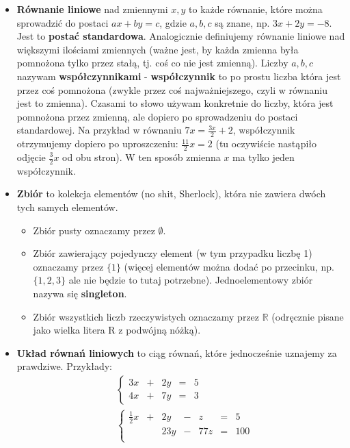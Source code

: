 \documentclass{article}
\theoremstyle{remark}
\begin{document}
\begin{itemize}
  \item \textbf{Równanie liniowe} nad zmiennymi $x, y$
  to każde równanie, które można sprowadzić do postaci
  $ax + by = c$, gdzie $a, b, c$ są znane, np. $3x+2y=-8$.
  Jest to \textbf{postać standardowa}.
  Analogicznie definiujemy równanie liniowe
  nad większymi ilościami zmiennych
  (ważne jest, by każda zmienna była pomnożona tylko przez
   stałą, tj. coś co nie jest zmienną).
  \subitem Liczby $a, b, c$ nazywam \textbf{współczynnikami} -
  \textbf{współczynnik} to po prostu liczba która jest przez coś pomnożona
  (zwykle przez coś najważniejszego, czyli w równaniu jest to zmienna).
  Czasami to słowo używam konkretnie do liczby, która jest pomnożona przez zmienną,
  ale dopiero po sprowadzeniu do postaci standardowej.
  Na przykład w równaniu $7x = \tfrac{3x}2 + 2$, współczynnik otrzymujemy dopiero po
   uproszczeniu:
  $\frac{11}2x = 2$ (tu oczywiście nastąpiło odjęcie $\frac32x$ od obu stron).
  W ten sposób zmienna $x$ ma tylko jeden współczynnik.
  \item \textbf{Zbiór} to kolekcja elementów (no shit, Sherlock),
    która nie zawiera dwóch tych samych elementów.
  \begin{itemize}
    \item Zbiór pusty oznaczamy przez $\emptyset$.
    \item Zbiór zawierający pojedynczy element (w tym przypadku liczbę 1)
  oznaczamy przez $\{1\}$ (więcej elementów można dodać po przecinku, np. $\{1, 2, 3\}$
  ale nie będzie to tutaj potrzebne). Jednoelementowy zbiór nazywa się \textbf{singleton}.
    \item Zbiór wszystkich liczb rzeczywistych oznaczamy przez $\mathbb R$
  (odręcznie pisane jako wielka litera R z podwójną nóżką).
  \end{itemize}
  \item \textbf{Układ równań liniowych} to ciąg równań, które jednocześnie uznajemy za prawdziwe.
  Przykłady:
  \begin{align*}
    &\left\{
    \begin{array}{lllll}
      3x &+& 2y &=& 5\\
      4x &+& 7y &=& 3
    \end{array}
    \right. \\
    &\left\{
    \begin{array}{lllllll}
      \tfrac12x &+& 2y &-&z &=& 5\\
       && 23y &-&77z &=& 100\\

\end{array}
\end{align*}
\end{itemize}
\end{document}
